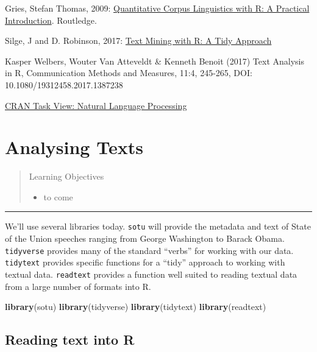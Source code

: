\documentclass[]{book}
\newenvironment{Shaded}{\begin{snugshade}}{\end{snugshade}}
\newcommand{\KeywordTok}[1]{\textcolor[rgb]{0.13,0.29,0.53}{\textbf{#1}}}
\newcommand{\NormalTok}[1]{#1}
\providecommand{\tightlist}{%
  \setlength{\itemsep}{0pt}\setlength{\parskip}{0pt}}
\begin{document}
Gries, Stefan Thomas, 2009: \href{http://www.stgries.info/research/qclwr/qclwr.html}{Quantitative Corpus Linguistics with R: A Practical Introduction}. Routledge.

Silge, J and D. Robinson, 2017: \href{http://tidytextmining.com/}{Text Mining with R: A Tidy Approach}

Kasper Welbers, Wouter Van Atteveldt \& Kenneth Benoit (2017) Text Analysis in R, Communication Methods and Measures, 11:4, 245-265, DOI: 10.1080/19312458.2017.1387238

\href{https://CRAN.R-project.org/view=NaturalLanguageProcessing}{CRAN Task View: Natural Language Processing}

\hypertarget{textanalysis}{%
\chapter{Analysing Texts}\label{textanalysis}}

\begin{quote}
Learning Objectives

\begin{itemize}
\tightlist
\item
  to come
\end{itemize}
\end{quote}

\begin{center}\rule{0.5\linewidth}{\linethickness}\end{center}

We'll use several libraries today. \texttt{sotu} will provide the metadata and text of State of the Union speeches ranging from George Washington to Barack Obama. \texttt{tidyverse} provides many of the standard ``verbs'' for working with our data. \texttt{tidytext} provides specific functions for a ``tidy'' approach to working with textual data. \texttt{readtext} provides a function well suited to reading textual data from a large number of formats into R.

\begin{Shaded}
\begin{Highlighting}[]
\KeywordTok{library}\NormalTok{(sotu)}
\KeywordTok{library}\NormalTok{(tidyverse)}
\KeywordTok{library}\NormalTok{(tidytext)}
\KeywordTok{library}\NormalTok{(readtext)}
\end{Highlighting}
\end{Shaded}

\hypertarget{reading-text-into-r}{%
\section{Reading text into R}\label{reading-text-into-r}}
\end{document}

